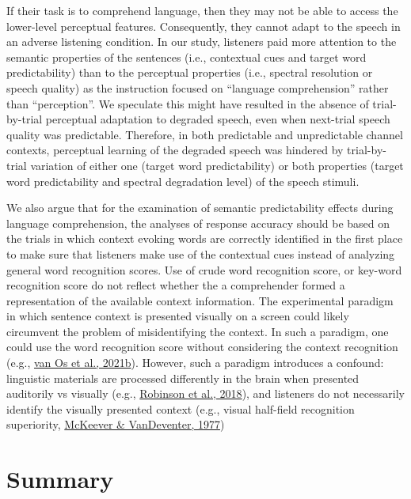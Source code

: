 \documentclass[a4paper, nobind]{templates/ociamthesis}
\begin{document}
If their task is to comprehend language, then they may not be able to access the lower-level perceptual features.
Consequently, they cannot adapt to the speech in an adverse listening condition.
In our study, listeners paid more attention to the semantic properties of the sentences (i.e., contextual cues and target word predictability) than to the perceptual properties (i.e., spectral resolution or speech quality) as the instruction focused on ``language comprehension'' rather than ``perception''.
We speculate this might have resulted in the absence of trial- by-trial perceptual adaptation to degraded speech, even when next-trial speech quality was predictable.
Therefore, in both predictable and unpredictable channel contexts, perceptual learning of the degraded speech was hindered by trial-by-trial variation of either one (target word predictability) or both properties (target word predictability and spectral degradation level) of the speech stimuli.

We also argue that for the examination of semantic predictability effects during language comprehension, the analyses of response accuracy should be based on the trials in which context evoking words are correctly identified in the first place to make sure that listeners make use of the contextual cues instead of analyzing general word recognition scores.
Use of crude word recognition score, or key-word recognition score do not reflect whether the a comprehender formed a representation of the available context information.
The experimental paradigm in which sentence context is presented visually on a screen could likely circumvent the problem of misidentifying the context.
In such a paradigm, one could use the word recognition score without considering the context recognition (e.g., \protect\hyperlink{ref-vanOs2021}{van Os et al., 2021b}).
However, such a paradigm introduces a confound:
linguistic materials are processed differently in the brain when presented auditorily vs visually (e.g., \protect\hyperlink{ref-Robinson2018}{Robinson et al., 2018}),
and listeners do not necessarily identify the visually presented context (e.g., visual half-field recognition superiority, \protect\hyperlink{ref-McKeever1977}{McKeever \& VanDeventer, 1977})

\hypertarget{summary-3}{%
\section{Summary}\label{summary-3}}
\end{document}
